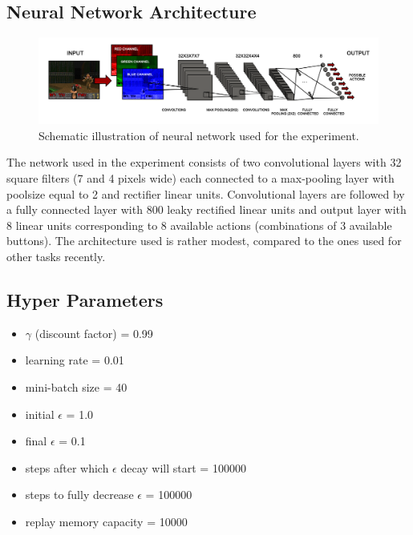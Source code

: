 \documentclass[english,bachelor,a4paper,twoside]{ppfcmthesis}
\begin{document}
	\subsection{Neural Network Architecture}
		\begin{figure}
			\centering
			\includegraphics[scale=0.25]{net_diagram.png}
			\caption{Schematic illustration of neural network used for the experiment.}\label{fig:network}
		\end{figure}
		 The network used in the experiment consists of two convolutional layers with 32 square filters (7 and 4 pixels wide) each connected to a max-pooling layer with poolsize equal to 2 and rectifier linear units. Convolutional layers are followed by a fully connected layer with 800 leaky rectified linear units and output layer with 8 linear units corresponding to 8 available actions (combinations of 3 available buttons). The architecture used is rather modest, compared to the ones used for other tasks recently.
	
	\subsection{Hyper Parameters}
		\begin{itemize}
		\item $\gamma$ (discount factor) = 0.99
		\item learning rate = 0.01
		\item mini-batch size = 40
		\item initial $\epsilon$ = 1.0
		\item final $\epsilon$ = 0.1
		\item steps after which $\epsilon$ decay will start = 100000
		\item steps to fully decrease $\epsilon$ = 100000
		\item replay memory  capacity = 10000
		\end{itemize}
	
\end{document}
